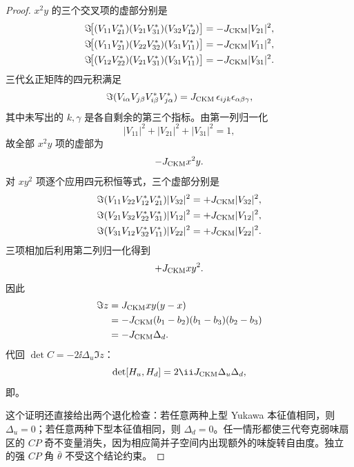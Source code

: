 \begin{proof}
$x^2y$ 的三个交叉项的虚部分别是
\begin{align*}
 \Im\!\big[(V_{11}V_{21}^*)(V_{21}V_{31}^*)(V_{32}V_{12}^*)\big]
 &=-J_{\rm CKM}|V_{21}|^2,\\
 \Im\!\big[(V_{11}V_{21}^*)(V_{22}V_{32}^*)(V_{31}V_{11}^*)\big]
 &=-J_{\rm CKM}|V_{11}|^2,\\
 \Im\!\big[(V_{12}V_{22}^*)(V_{21}V_{31}^*)(V_{31}V_{11}^*)\big]
 &=-J_{\rm CKM}|V_{31}|^2.
\end{align*}
三代幺正矩阵的四元积满足
\begin{equation*}
 \Im(V_{i\alpha}V_{j\beta}V_{i\beta}^*V_{j\alpha}^*)
 =J_{\rm CKM}\,\epsilon_{ijk}\epsilon_{\alpha\beta\gamma},
\end{equation*}
其中未写出的 $k,\gamma$ 是各自剩余的第三个指标。由第一列归一化
\begin{equation*}
 |V_{11}|^2+|V_{21}|^2+|V_{31}|^2=1,
\end{equation*}
故全部 $x^2y$ 项的虚部为
\begin{equation*}
 -J_{\rm CKM}x^2y.
\end{equation*}
对 $xy^2$ 项逐个应用四元积恒等式，三个虚部分别是
\begin{align*}
 \Im(V_{11}V_{22}V_{12}^*V_{21}^*)|V_{32}|^2
 &=+J_{\rm CKM}|V_{32}|^2,\\
 \Im(V_{21}V_{32}V_{22}^*V_{31}^*)|V_{12}|^2
 &=+J_{\rm CKM}|V_{12}|^2,\\
 \Im(V_{31}V_{12}V_{32}^*V_{11}^*)|V_{22}|^2
 &=+J_{\rm CKM}|V_{22}|^2.
\end{align*}
三项相加后利用第二列归一化得到
\begin{equation*}
 +J_{\rm CKM}xy^2.
\end{equation*}
因此
\begin{align*}
 \Im z
 &=J_{\rm CKM}xy(y-x)\\
 &=-J_{\rm CKM}(b_1-b_2)(b_1-b_3)(b_2-b_3)\\
 &=-J_{\rm CKM}\Delta_d.
\end{align*}
代回 $\det C=-2\ii\Delta_u\Im z$：
\begin{equation*}
 \det[H_u,H_d]
 =2\ii J_{\rm CKM}\Delta_u\Delta_d,
\end{equation*}
即。

这个证明还直接给出两个退化检查：若任意两种上型 Yukawa 本征值相同，则 $\Delta_u=0$；若任意两种下型本征值相同，则 $\Delta_d=0$。任一情形都使三代夸克弱味扇区的 $CP$ 奇不变量消失，因为相应简并子空间内出现额外的味旋转自由度。独立的强 $CP$ 角 $\bar\theta$ 不受这个结论约束。
\end{proof}


